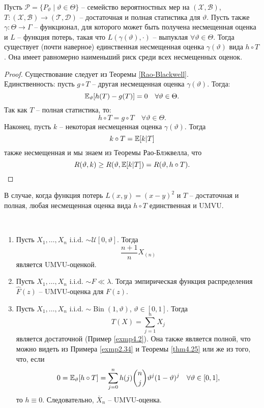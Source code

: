 \begin{thm} \label{Lehmann-Scheffe}
	Пусть $\mathcal{P}=\{ P_\vartheta \mid \vartheta \in \Theta \}$ -- семейство вероятностных мер на $(\mathcal{X},\mathcal{B})$, $T\colon(\mathcal{X},\mathcal{B}) \rightarrow (\mathcal{T},\mathcal{D})$ -- достаточная и полная статистика для $\vartheta$. Пусть также $\gamma\colon\Theta \rightarrow \Gamma$ -- функционал, для которого может быть получена несмещенная оценка и $L$ -- функция потерь, такая что $L(\gamma(\vartheta), \cdot)$ -- выпуклая $\forall \vartheta \in \Theta$. Тогда существует (почти наверное) единственная несмещенная оценка $\gamma(\vartheta)$ вида $h \circ T$. Она имеет равномерно наименьший риск среди всех несмещенных оценок.
\end{thm}
\begin{proof}
	Существование следует из Теоремы \ref{Rao-Blackwell}. \\
	Единственность: пусть $g \circ T$ -- другая несмещенная оценка $\gamma(\vartheta)$. Тогда:
	\[ \mathbb{E}_\vartheta[h(T)-g(T)]=0 \quad \forall \vartheta \in \Theta. \]
	Так как $T$ -- полная статистика, то:
	\[ h \circ T = g \circ T \quad \forall \vartheta \in \Theta. \]
	Наконец, пусть $k$ -- некоторая несмещенная оценка $\gamma(\vartheta)$. Тогда
	\[k \circ T = \mathbb{E}[k|T]\]
	также несмещенная и мы знаем из Теоремы Рао-Блэквелла, что
	\[ R(\vartheta, k) \geq R(\vartheta, \mathbb{E}[k|T])=R(\vartheta, h \circ T). \]
\end{proof}

\begin{crlr}
	В случае, когда функция потерь $L(x,y)=(x-y)^2$ и $T$ -- достаточная и полная, любая несмещенная оценка вида $h \circ T$ единственная и UMVU.
\end{crlr}

\begin{exmp} \label{exmp4.30} \
	\begin{enumerate}
		\item Пусть $X_1, \dots, X_n$ i.i.d. $\sim \mathcal{U}[0,\vartheta]$. Тогда
		\[ \frac{n+1}{n}X_{(n)} \]
		является UMVU-оценкой.
		\item Пусть $X_1, \dots, X_n$ i.i.d. $\sim F \ll \lambda$. Тогда эмпирическая функция распределения $\hat{F}(z)$ -- UMVU-оценка для $F(z)$.
		\item Пусть $X_1, \dots, X_n$ i.i.d. $\sim \operatorname{Bin}(1,\vartheta)$, $\vartheta \in [0, 1]$. Тогда
		\[ T(X)=\sum_{j=1}^{n}X_j \]
		является достаточной (Пример \ref{exmp4.2}). Она также является полной, что можно видеть из Примера \ref{exmp2.34} и Теоремы \ref{thm4.25} или же из того, что, если
		\[ 0 = \mathbb{E}_\vartheta[h \circ T]=\sum_{j=0}^{n}h(j)\binom{n}{j}\vartheta^j(1-\vartheta)^j \quad \forall \vartheta \in [0, 1], \]
		то $h \equiv 0$. Следовательно, $\overline{X}_n$ -- UMVU-оценка.
	\end{enumerate}
\end{exmp}

